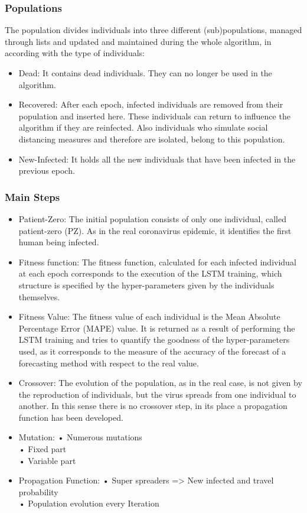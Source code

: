 \documentclass[letterpaper]{article}%
\begin{document}
\subsubsection{Populations}
	The population divides individuals into three different (sub)populations, managed through lists and updated and maintained during the whole algorithm, in according with the type of individuals:
\begin{itemize}
\item Dead: It contains dead individuals. They can no longer be used in the algorithm.
\item Recovered: After each epoch, infected individuals are removed from their population and inserted here. These individuals can return to influence the algorithm if they are reinfected. Also individuals who simulate social distancing measures and therefore are isolated, belong to this population.
\item New-Infected: It holds all the new individuals that have been infected in the previous epoch.
\end{itemize}

\subsubsection{Main Steps}
\begin{itemize}
\item Patient-Zero: The initial population consists of only one individual, called patient-zero (PZ). As in the real coronavirus epidemic, it identifies the first human being infected.
\item Fitness function: The fitness function, calculated for each infected individual at each epoch corresponds to the execution of the LSTM training, which structure is specified by the hyper-parameters given by the individuals themselves.
\item Fitness Value: The fitness value of each individual is the Mean Absolute Percentage Error (MAPE) value. It is returned as a result of performing the LSTM training and tries to quantify the goodness of the hyper-parameters used, as it corresponds to the measure of the accuracy of the forecast of a forecasting method with respect to the real value.
\item Crossover: The evolution of the population, as in the real case, is not given by the reproduction of individuals, but the virus spreads from one individual to another. In this sense there is no crossover step, in its place a propagation function has been developed.
\item Mutation: 
• Numerous mutations\\
• Fixed part\\
• Variable part
\item Propagation Function:
• Super spreaders => New infected and travel probability\\
• Population evolution every Iteration\\
\end{itemize}
\end{document}
